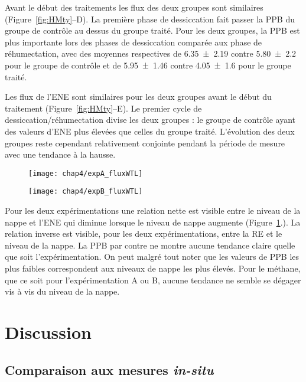 Avant le début des traitements les flux des deux groupes sont similaires (Figure~\ref{fig:HMty}--D).
La première phase de dessiccation fait passer la PPB du groupe de contrôle au dessus du groupe traité.
Pour les deux groupes, la PPB est plus importante lors des phases de dessiccation comparée aux phase de réhumectation, avec des moyennes respectives de \num{6.35(219)} contre \num{5.80(220)} pour le groupe de contrôle et de \num{5.95(146)} contre \SI{4.05(160)}{\uml} pour le groupe traité.

Les flux de l'ENE sont similaires pour les deux groupes avant le début du traitement (Figure~\ref{fig:HMty}--E).
Le premier cycle de dessiccation/réhumectation divise les deux groupes : le groupe de contrôle ayant des valeurs d'ENE plus élevées que celles du groupe traité.
L'évolution des deux groupes reste cependant relativement conjointe pendant la période de mesure avec une tendance à la hausse.

\begin{figure}
\centering
\begin{minipage}{.5\textwidth}
  \centering
  \texttt{[image: chap4/expA\_fluxWTL]}
  \label{fig:test1}
\end{minipage}%
\begin{minipage}{.5\textwidth}
  \centering
  \texttt{[image: chap4/expB\_fluxWTL]}
  \label{fig:test2}
\end{minipage}
\end{figure}

Pour les deux expérimentations une relation nette est visible entre le niveau de la nappe et l'ENE qui diminue lorsque le niveau de nappe augmente (Figure~\ref{fig:test2}.).
La relation inverse est visible, pour les deux expérimentations, entre la RE et le niveau de la nappe.
La PPB par contre ne montre aucune tendance claire quelle que soit l'expérimentation.
On peut malgré tout noter que les valeurs de PPB les plus faibles correspondent aux niveaux de nappe les plus élevés.
Pour le méthane, que ce soit pour l'expérimentation A ou B, aucune tendance ne semble se dégager vis à vis du niveau de la nappe.


\section{Discussion}

\subsection{Comparaison aux mesures \textit{in-situ}}

